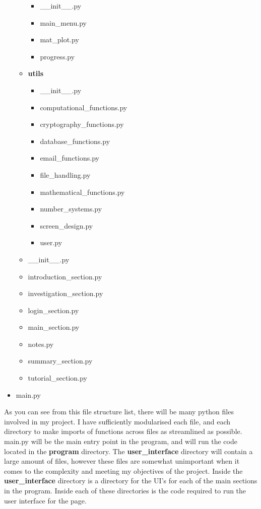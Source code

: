\documentclass[12pt]{article}
\begin{document}
\begin{itemize}
\begin{itemize}
\begin{itemize}
\begin{itemize}
            \end{itemize}
            \item \_\_init\_\_.py
            \item main\_menu.py
            \item mat\_plot.py
            \item progress.py
        \end{itemize}
        \item \textbf{utils}
        \begin{itemize}
            \item \_\_init\_\_.py
            \item computational\_functions.py
            \item cryptography\_functions.py
            \item database\_functions.py
            \item email\_functions.py
            \item file\_handling.py
            \item mathematical\_functions.py
            \item number\_systems.py
            \item screen\_design.py
            \item user.py
        \end{itemize}
        \item \_\_init\_\_.py
        \item introduction\_section.py
        \item investigation\_section.py
        \item login\_section.py
        \item main\_section.py
        \item notes.py
        \item summary\_section.py
        \item tutorial\_section.py
    \end{itemize}
    \item main.py
\end{itemize}

As you can see from this file structure list, there will be many python files involved in my project. I have sufficiently modularised each file, and each directory to make imports of functions across files as streamlined as possible. main.py will be the main entry point in the program, and will run the code located in the \textbf{program} directory. The \textbf{user\_interface} directory will contain a large amount of files, however these files are somewhat unimportant when it comes to the complexity and meeting my objectives of the project. Inside the \textbf{user\_interface} directory is a directory for the UI's for each of the main sections in the program. Inside each of these directories is the code required to run the user interface for the page.
\end{document}
